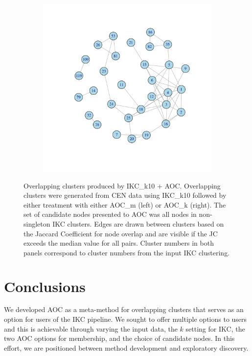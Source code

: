 \documentclass[12pt, oneside]{article}   	%
\begin{document}
{\begin{figure}[H]
\begin{subfigure}[t]{0.48\textwidth}
\includegraphics[width=\linewidth]{ikc10_k_pw.pdf} 
\end{subfigure}
\caption{Overlapping clusters produced by IKC\_k10 + AOC.  Overlapping clusters were generated from CEN data using IKC\_k10 followed by either treatment with either AOC\_m (left) or AOC\_k (right). The set of candidate nodes presented to AOC was all nodes in non-singleton IKC clusters. Edges are drawn between clusters based on the Jaccard Coefficient for node overlap and are visible if the JC exceeds the median value for all pairs. Cluster numbers in both panels correspond to cluster numbers from the input IKC clustering.}
\label{fig:overlapping}
\end{figure}
		
\clearpage
	
\section{Conclusions} We developed AOC as a meta-method for overlapping clusters that serves as an option for users of the IKC pipeline. We sought to offer multiple options to users and this is achievable through varying the input data, the $k$ setting for IKC, the two AOC  options for membership, and the choice of candidate nodes. In this effort, we are positioned between method development and exploratory discovery. 

}
\end{document}
